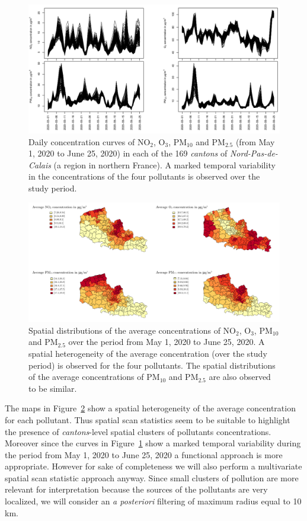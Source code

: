 \begin{figure}[htbp]
\centering
\includegraphics[width=\linewidth]{curves_real_data.pdf}
\caption{Daily concentration curves of $\text{NO}_2$, $\text{O}_3$, $\text{PM}_{10}$ and $\text{PM}_{2.5}$ (from May 1, 2020 to June 25, 2020) in each of the 169 \textit{cantons} of \textit{Nord-Pas-de-Calais} (a region in northern France). A marked temporal variability in the concentrations of the four pollutants is observed over the study period.}
\label{fig:description_curves}
\end{figure}
\begin{figure}[htbp]
\centering
\includegraphics[width=\linewidth]{map_real_data.pdf}
\caption{Spatial distributions of the average concentrations of $\text{NO}_2$, $\text{O}_3$, $\text{PM}_{10}$ and $\text{PM}_{2.5}$ over the period from May 1, 2020 to June 25, 2020. A spatial heterogeneity of the average concentration (over the study period) is observed for the four pollutants. The spatial distributions of the average concentrations of $\text{PM}_{10}$ and $\text{PM}_{2.5}$ are also observed to be similar.}
\label{fig:description_mean}
\end{figure}

\noindent The maps in Figure~\ref{fig:description_mean} show a spatial heterogeneity of the average concentration for each pollutant.  Thus spatial scan statistics seem to be suitable to highlight the presence of \textit{cantons}-level spatial clusters of pollutants concentrations. 
Moreover since the curves in Figure~\ref{fig:description_curves} show a marked temporal variability during the period from May 1, 2020 to June 25, 2020 a functional approach is more appropriate. However for sake of completeness we will also perform a multivariate spatial scan statistic approach anyway.
Since small clusters of pollution are more relevant for interpretation because the sources of the pollutants are very localized, we will consider an \textit{a posteriori} filtering of maximum radius equal to 10 km.

